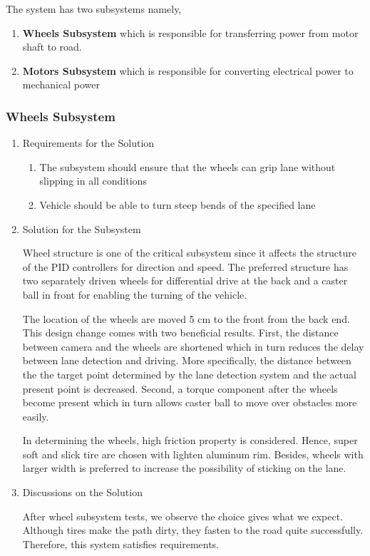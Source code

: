 \documentclass[a4paper,12pt]{article}
\begin{document}
	
	The system has two subsystems namely,

	\begin{enumerate}
		\item \textbf{Wheels Subsystem} which is responsible for transferring power from motor shaft to road.
		\item \textbf{Motors Subsystem} which is responsible for converting electrical power to mechanical power
	\end{enumerate}


	\subsubsection{Wheels Subsystem}
	
		\begin{enumerate}
			\item {Requirements for the Solution}
			
			\begin{enumerate}
				\item The subsystem should ensure that the wheels can grip lane without slipping in all conditions
				\item Vehicle should be able to turn steep bends of the specified lane
			\end{enumerate}


	\item {Solution for the Subsystem}
	
	Wheel structure is one of the critical subsystem since it affects the structure of the PID controllers for direction and speed. The preferred structure has two separately driven wheels for differential drive at the back and a caster ball in front for enabling the turning of the vehicle.  
	
	The location of the wheels are moved 5 cm to the front from the back end. This design change comes with two beneficial results. First, the distance between camera and the wheels are shortened which in turn reduces the delay between lane detection and driving. More specifically, the distance between the the target point determined by the lane detection system and the actual present point is decreased. Second, a torque component after the wheels become present which in turn allows caster ball to move over obstacles more easily.
	
	In determining the wheels, high friction property is considered. Hence, super soft and slick tire are chosen with lighten aluminum rim. Besides, wheels with larger width is preferred to increase the possibility of sticking on the lane.      


	\item {Discussions on the Solution}
	
	After wheel subsystem tests, we observe the choice gives what we expect. Although tires make the path dirty, they fasten to the road quite successfully. Therefore, this system satisfies requirements.

	\end{enumerate}
\end{document}
